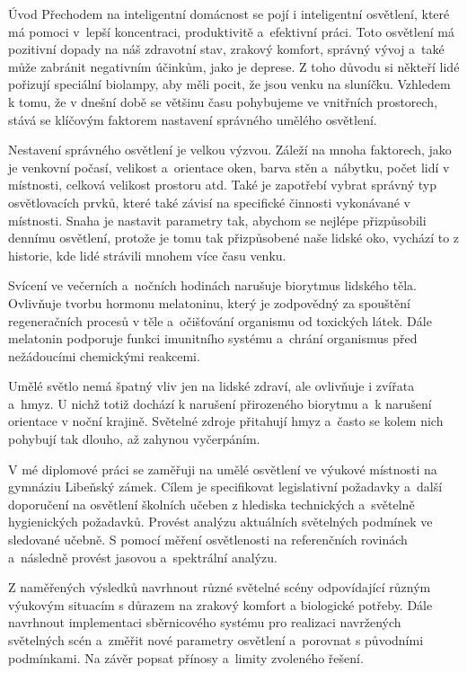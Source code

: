 \chap Úvod
Přechodem na inteligentní domácnost se pojí i inteligentní osvětlení, které má pomoci
v~lepší koncentraci, produktivitě a~efektivní práci. Toto osvětlení má pozitivní dopady
na náš zdravotní stav, zrakový komfort, správný vývoj a~také může zabránit negativním
účinkům, jako je deprese. Z toho důvodu si někteří lidé pořizují speciální biolampy, aby
měli pocit, že jsou venku na sluníčku. Vzhledem k tomu, že v dnešní době se většinu času
pohybujeme ve vnitřních prostorech, stává se klíčovým faktorem nastavení správného
umělého osvětlení.

Nestavení správného osvětlení je velkou výzvou. Záleží na mnoha faktorech, jako je
venkovní počasí, velikost a~orientace oken, barva stěn a~nábytku, počet lidí v místnosti,
celková velikost prostoru atd. Také je zapotřebí vybrat správný typ osvětlovacích prvků,
které také závisí na specifické činnosti vykonávané v místnosti. Snaha je nastavit parametry
tak, abychom se nejlépe přizpůsobili dennímu osvětlení, protože je tomu tak
přizpůsobené naše lidské oko, vychází to z historie, kde lidé strávili mnohem více času
venku.

Svícení ve večerních a~nočních hodinách narušuje biorytmus lidského těla. Ovlivňuje
tvorbu hormonu melatoninu, který je zodpovědný za spouštění regeneračních procesů
v těle a~očišťování organismu od toxických látek. Dále melatonin podporuje funkci
imunitního systému a~chrání organismus před nežádoucími chemickými reakcemi.

Umělé světlo nemá špatný vliv jen na lidské zdraví, ale ovlivňuje i zvířata a~hmyz.
U nichž totiž dochází k narušení přirozeného biorytmu a~k narušení orientace v noční
krajině. Světelné zdroje přitahují hmyz a~často se kolem nich pohybují tak dlouho, až
zahynou vyčerpáním.

V mé diplomové práci se zaměřuji na umělé osvětlení ve výukové místnosti na gymnáziu
Libeňský zámek. Cílem je specifikovat legislativní požadavky a~další doporučení
na osvětlení školních učeben z hlediska technických a~světelně hygienických požadavků.
Provést analýzu aktuálních světelných podmínek ve sledované učebně. S pomocí měření
osvětlenosti na referenčních rovinách a~následně provést jasovou a~spektrální analýzu.

Z naměřených výsledků navrhnout různé světelné scény odpovídající různým výukovým
situacím s důrazem na zrakový komfort a
biologické potřeby. Dále navrhnout implementaci sběrnicového systému pro realizaci
navržených světelných scén a~změřit nové parametry osvětlení a~porovnat s původními
podmínkami. Na závěr popsat přínosy a~limity zvoleného řešení.

